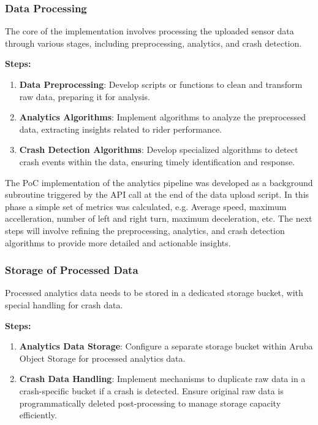 \subsubsection{Data Processing}
The core of the implementation involves processing the uploaded sensor data through various stages, including preprocessing, analytics, and crash detection.

\textbf{Steps:}
\begin{enumerate}
    \item \textbf{Data Preprocessing}: Develop scripts or functions to clean and transform raw data, preparing it for analysis.
    \item \textbf{Analytics Algorithms}: Implement algorithms to analyze the preprocessed data, extracting insights related to rider performance.
    \item \textbf{Crash Detection Algorithms}: Develop specialized algorithms to detect crash events within the data, ensuring timely identification and response.
\end{enumerate}

The PoC implementation of the analytics pipeline was developed as a background subroutine triggered by the API call at the end of the data upload script. In this phase a simple set of metrics was calculated, e.g. Average speed, maximum accelleration, number of left and right turn, maximum deceleration, etc. The next steps will involve refining the preprocessing, analytics, and crash detection algorithms to provide more detailed and actionable insights.

\subsubsection{Storage of Processed Data}
Processed analytics data needs to be stored in a dedicated storage bucket, with special handling for crash data.

\textbf{Steps:}
\begin{enumerate}
    \item \textbf{Analytics Data Storage}: Configure a separate storage bucket within Aruba Object Storage for processed analytics data.
    \item \textbf{Crash Data Handling}: Implement mechanisms to duplicate raw data in a crash-specific bucket if a crash is detected. Ensure original raw data is programmatically deleted post-processing to manage storage capacity efficiently.
\end{enumerate}

